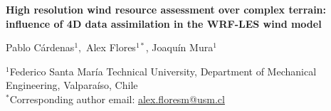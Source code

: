 \bce
\large{\textbf{High resolution wind resource assessment over complex terrain: influence of 4D data assimilation in the WRF-LES wind model}}\\
\ece

Pablo Cárdenas$^1,$ Alex Flores$^{1*}$, Joaquín Mura$^{1}$

\bigskip
$^1$Federico Santa María Technical University, Department of Mechanical Engineering, Valparaíso, Chile \\
$^*$Corresponding author email: \href{mailto:alex.floresm@usm.cl}{alex.floresm@usm.cl}

\bigskip

